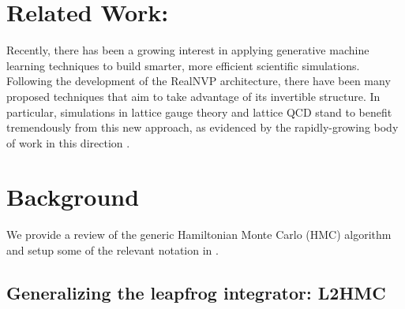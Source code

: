 \documentclass{article} %
\newcommand{\JCO}[1]{\textcolor{red}{[#1]}}
\begin{document}
\section{\label{sec:related_work}Related Work:}
Recently, there has been a growing interest in applying generative machine learning techniques to build smarter, more efficient scientific simulations.
%
%
%
Following the development of the RealNVP \citep{dinhRealNVP} architecture, there have been many proposed techniques that aim to take advantage of its invertible structure.
%
In particular, simulations in lattice gauge theory and lattice QCD stand to benefit tremendously from this new approach, as evidenced by the rapidly-growing body of work in this direction 
\citep{%
   albergo2019flow,albergo2021introduction,favoni2020lattice,medvidovic2020generative,neklyudov2020orbital,
   neklyudov2020involutive, li2020neural,boyda2020sampling,kanwar2020equivariant,toth2019hamiltonian,
   hoffman2019neutra,wehenkel2020you,pasarica2010adaptively, dinhRealNVP,tanaka2017towards,schaefer2009investigating,
   cossu2018testing,rezende2020normalizing%
}.

\section{\label{sec:background}Background}
We provide a review of the generic Hamiltonian Monte Carlo (HMC) algorithm and setup some of the relevant notation in
.
%
\subsection{\label{sec:l2hmc}Generalizing the leapfrog integrator: L2HMC}
%
%
%
\end{document}
